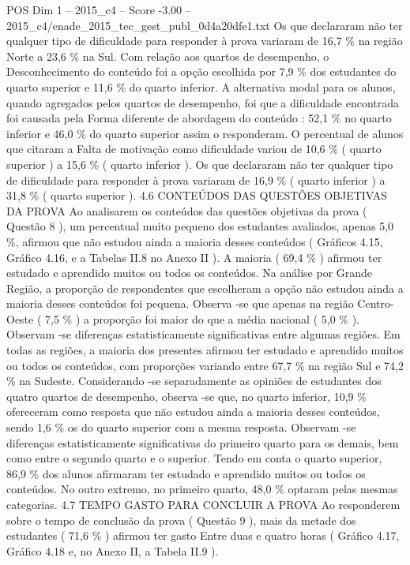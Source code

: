 \begin{textsample}{POS Dim 1 – 2015\_c4 – Score -3.00 – 2015\_c4/enade\_2015\_tec\_gest\_publ\_0d4a20dfe1.txt}
Os que declararam não ter qualquer tipo de dificuldade para responder à prova variaram de 16,7 \% na região Norte a 23,6 \% na Sul.
Com relação aos quartos de desempenho, o Desconhecimento do conteúdo foi a opção escolhida por 7,9 \% dos estudantes do quarto superior e 11,6 \% do quarto inferior.
A alternativa modal para os alunos, quando agregados pelos quartos de desempenho, foi que a dificuldade encontrada foi causada pela Forma diferente de abordagem do conteúdo : 52,1 \% no quarto inferior e 46,0 \% do quarto superior assim o responderam.
O percentual de alunos que citaram a Falta de motivação como dificuldade variou de 10,6 \% ( quarto superior ) a 15,6 \% ( quarto inferior ).
Os que declararam não ter qualquer tipo de dificuldade para responder à prova variaram de 16,9 \% ( quarto inferior ) a 31,8 \% ( quarto superior ). 4.6 CONTEÚDOS DAS QUESTÕES OBJETIVAS DA PROVA Ao analisarem os conteúdos das questões objetivas da prova ( Questão 8 ), um percentual muito pequeno dos estudantes avaliados, apenas 5,0 \%, afirmou que não estudou ainda a maioria desses conteúdos ( Gráficos 4.15, Gráfico 4.16, e a Tabelas II.8 no Anexo II ).
A maioria ( 69,4 \% ) afirmou ter estudado e aprendido muitos ou todos os conteúdos.
Na análise por Grande Região, a proporção de respondentes que escolheram a opção não estudou ainda a maioria desses conteúdos foi pequena.
Observa -se que apenas na região Centro-Oeste ( 7,5 \% ) a proporção foi maior do que a média nacional ( 5,0 \% ).
Observam -se diferenças estatisticamente significativas entre algumas regiões.
Em todas as regiões, a maioria dos presentes afirmou ter estudado e aprendido muitos ou todos os conteúdos, com proporções variando entre 67,7 \% na região Sul e 74,2 \% na Sudeste.
Considerando -se separadamente as opiniões de estudantes dos quatro quartos de desempenho, observa -se que, no quarto inferior, 10,9 \% ofereceram como resposta que não estudou ainda a maioria desses conteúdos, sendo 1,6 \% os do quarto superior com a mesma resposta.
Observam -se diferenças estatisticamente significativas do primeiro quarto para os demais, bem como entre o segundo quarto e o superior.
Tendo em conta o quarto superior, 86,9 \% dos alunos afirmaram ter estudado e aprendido muitos ou todos os conteúdos.
No outro extremo, no primeiro quarto, 48,0 \% optaram pelas mesmas categorias. 4.7 TEMPO GASTO PARA CONCLUIR A PROVA Ao responderem sobre o tempo de conclusão da prova ( Questão 9 ), mais da metade dos estudantes ( 71,6 \% ) afirmou ter gasto Entre duas e quatro horas ( Gráfico 4.17, Gráfico 4.18 e, no Anexo II, a Tabela II.9 ).

\end{textsample}
